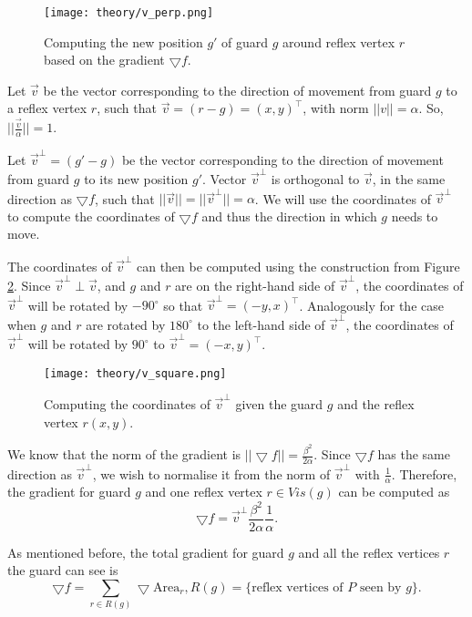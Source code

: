 \begin{figure}[h!]
    \centering
    \texttt{[image: theory/v\_perp.png]}
    \caption{Computing the new position $g'$ of guard $g$ around reflex vertex $r$ based on the gradient $\bigtriangledown f$.}
    \label{fig:vperp}
\end{figure}

Let $\vec v$ be the vector corresponding to the direction of movement from guard $g$ to a reflex vertex $r$, such that $\vec{v} = (r - g) = (x, y)^\intercal$, with norm $||v|| = \alpha$. So, $||\frac{\vec v}{\alpha}|| = 1$.

Let $\vec{v}^\perp  = (g' - g)$ be the vector corresponding to the direction of movement from guard $g$ to its new position $g'$. Vector $\vec v^\perp$ is orthogonal to $\vec{v}$, in the same direction as $\bigtriangledown f$, such that $||\vec{v}|| = ||\vec{v}^\perp|| = \alpha$. We will use the coordinates of $\vec{v}^\perp$ to compute the coordinates of $\bigtriangledown f$ and thus the direction in which $g$ needs to move.

The coordinates of $\vec v^\perp$ can then be computed using the construction from Figure \ref{fig:vsquare}. Since $\vec v^\perp \perp \vec v$, and $g$ and $r$ are on the right-hand side of $\vec v^\perp$, the coordinates of $\vec v^\perp$ will be rotated by $-90^\circ$ so that $\vec v^\perp = (-y, x)^\intercal$. Analogously for the case when $g$ and $r$ are rotated by $180^\circ$ to the left-hand side of $\vec v^\perp$, the coordinates of $\vec v^\perp$ will be rotated by $90^\circ$ to $\vec v^\perp = (-x, y)^\intercal$.

\begin{figure}[h!]
    \centering
    \texttt{[image: theory/v\_square.png]}
    \caption{Computing the coordinates of $\vec v^\perp$ given the guard $g$ and the reflex vertex $r(x, y)$.}
    \label{fig:vsquare}
\end{figure}

We know that the norm of the gradient is $||\bigtriangledown f|| = \frac{\beta^2}{2\alpha}$. Since $\bigtriangledown f$ has the same direction as $\vec v^\perp$, we wish to normalise it from the norm of $\vec v^\perp$ with $\frac 1 \alpha$. Therefore, the gradient for guard $g$ and one reflex vertex $r \in Vis(g)$ can be computed as $$\bigtriangledown f = \vec v^\perp \frac{\beta^2}{2\alpha} \frac 1 \alpha.$$

As mentioned before, the total gradient for guard $g$ and all the reflex vertices $r$ the guard can see is $$\bigtriangledown f = \sum_{r \in R(g)} \bigtriangledown \text{Area}_r, R(g) = \{\text{reflex vertices of } P \text{ seen by }g\}.$$

